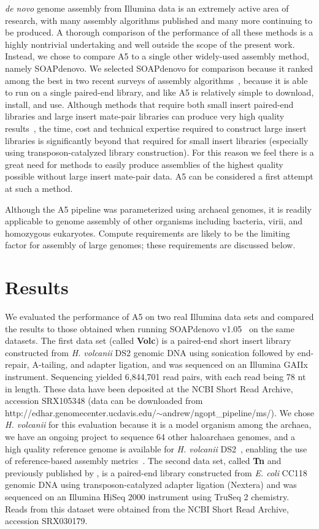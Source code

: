 \documentclass[10pt]{article}
\begin{document}
\emph{de novo} genome assembly from Illumina data is an extremely active area of research, with many assembly algorithms published and many more continuing to be produced.
A thorough comparison of the performance of all these methods is a highly nontrivial undertaking and well outside the scope of the present  
work. Instead, we chose to compare A5 to a single other widely-used assembly method, namely SOAPdenovo. We selected SOAPdenovo for comparison
because it ranked among the best in two recent surveys of assembly algorithms~\cite{Earl2011,Salzberg2011}, because it is able to run on a single paired-end
library, and like A5 is relatively simple to download, install, and use. Although methods that require both small insert paired-end libraries
and large insert mate-pair libraries can produce very high quality results~\cite{Gnerre2011}, the time, cost and technical expertise required to construct large insert
libraries is significantly beyond that required for small insert libraries (especially using transposon-catalyzed library construction).
For this reason we feel there is a great need for methods to easily produce assemblies of the highest quality possible without large insert mate-pair data.
A5 can be considered a first attempt at such a method.

Although the A5 pipeline was parameterized using archaeal genomes, it is readily applicable to genome assembly of other organisms including bacteria, virii, and homozygous eukaryotes. Compute requirements are likely to be the limiting factor for assembly of large genomes; these requirements are discussed below.

\section*{Results}

We evaluated the performance of A5 on two real Illumina data sets and compared the results to
those obtained when running SOAPdenovo v1.05~\cite{Li2010} on the same datasets. The first data set (called \textbf{Volc}) is a paired-end short insert library constructed from \emph{H. volcanii} DS2 genomic DNA 
using sonication followed by end-repair, A-tailing, and adapter ligation, and was sequenced on an Illumina GAIIx instrument.
Sequencing yielded 6,844,701 read pairs, with each read being 78 nt in length. These data have been deposited at the NCBI Short Read Archive, accession SRX105348 (data can be downloaded
from http://edhar.genomecenter.ucdavis.edu/${\sim}$andrew/ngopt\_pipeline/ms/). 
We chose \emph{H. volcanii} for this evaluation because it is a model organism among the archaea, we have an ongoing project to sequence 64 other haloarchaea genomes, and a high quality reference genome is available for \emph{H. volcanii} DS2~\cite{Hartman2010}, enabling the use of reference-based assembly metrics~\cite{Darling2011}.  
The second data set, called \textbf{Tn} and previously published by \cite{Adey2010}, is a paired-end library constructed from \emph{E. coli} CC118 genomic DNA
using transposon-catalyzed adapter ligation (Nextera) and was sequenced on an Illumina HiSeq 2000 instrument using TruSeq 2 chemistry. 
Reads from this dataset were obtained from the NCBI Short Read Archive, accession SRX030179.
\end{document}
